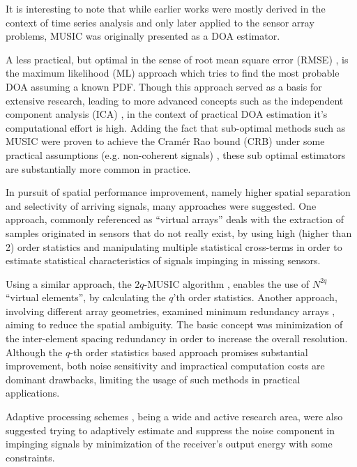 It is interesting to note that while earlier works were mostly derived in the context of time series analysis and only later applied to the sensor array problems, MUSIC was originally presented as a DOA estimator.
\par A less practical, but optimal in the sense of root mean square error (RMSE) \cite{krim1996two}, is the maximum likelihood (ML) approach which tries to find the most probable DOA assuming a known PDF.
Though this approach served as a basis for extensive research, leading to more advanced concepts such as the independent component analysis (ICA) \cite{hyvarinen1999survey}, in the context of practical DOA estimation it's computational effort is high.
Adding the fact that sub-optimal methods such as MUSIC were proven to achieve the Cram\'er Rao bound (CRB) under some practical assumptions (e.g. non-coherent signals) \cite{stoica1989music}, these sub optimal estimators are substantially more common in practice. 
\par In pursuit of spatial performance improvement, namely higher spatial separation and selectivity of arriving signals, many approaches were suggested.  
One approach, commonly referenced as ``virtual arrays'' \cite{pal2010nested,chevalier2005virtual,dogan1995applications} deals with the extraction of samples originated in sensors that do not really exist, by using high (higher than 2) order statistics and manipulating multiple statistical cross-terms in order to estimate statistical characteristics of signals impinging in missing sensors.
\par Using a similar approach, the $2q$-MUSIC algorithm \cite{chevalier2006high}, enables the use of $N^{2q}$ ``virtual elements'', by calculating the $q$'th order statistics.
Another approach, involving different array geometries, examined minimum redundancy arrays \cite{moffet1968minimum,pillai1985new,pillai1987statistical,Kupershtein2013}, aiming to reduce the spatial ambiguity. The basic concept was minimization of the inter-element spacing redundancy in order to increase the overall resolution.
Although the $q$-th order statistics based approach promises substantial improvement, both noise sensitivity and impractical computation costs are dominant drawbacks, limiting the usage of such methods in practical applications.   
\par Adaptive processing schemes \cite{frost1972algorithm,manolakis2000statistical}, being a wide and active research area, were also suggested trying to adaptively estimate and suppress the noise component in impinging signals by minimization of the receiver's output energy with some constraints.
